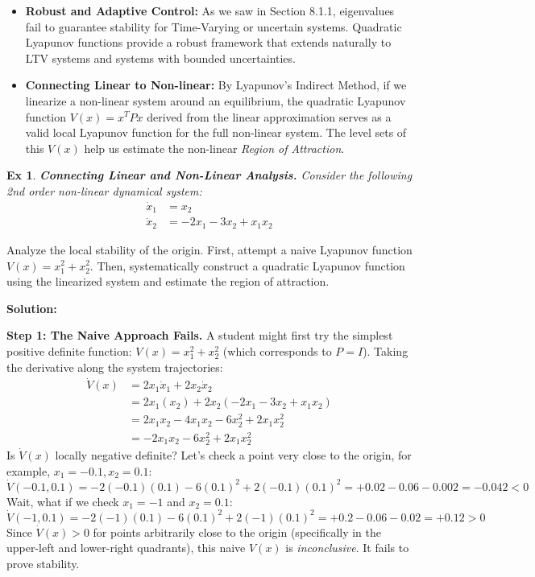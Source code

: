 \documentclass[twoside, 11pt]{article}
\newtheorem{exmp}[theorem]{Ex}
\begin{document}
\begin{itemize}
    \item \textbf{Robust and Adaptive Control:} As we saw in Section 8.1.1, eigenvalues fail to guarantee stability for Time-Varying or uncertain systems. Quadratic Lyapunov functions provide a robust framework that extends naturally to LTV systems and systems with bounded uncertainties.
    \item \textbf{Connecting Linear to Non-linear:} By Lyapunov's Indirect Method, if we linearize a non-linear system around an equilibrium, the quadratic Lyapunov function $V(x) = x^T P x$ derived from the linear approximation serves as a valid local Lyapunov function for the full non-linear system. The level sets of this $V(x)$ help us estimate the non-linear \textit{Region of Attraction}.
\end{itemize}

\begin{exmp}
\textbf{Connecting Linear and Non-Linear Analysis.} Consider the following 2nd order non-linear dynamical system:
\begin{align*}
\dot{x}_1 &= x_2 \\
\dot{x}_2 &= -2x_1 - 3x_2 + x_1 x_2
\end{align*}
\end{exmp}
Analyze the local stability of the origin. First, attempt a naive Lyapunov function $V(x) = x_1^2 + x_2^2$. Then, systematically construct a quadratic Lyapunov function using the linearized system and estimate the region of attraction.

\textbf{Solution:}

\textbf{Step 1: The Naive Approach Fails.}
A student might first try the simplest positive definite function: $V(x) = x_1^2 + x_2^2$ (which corresponds to $P = I$). Taking the derivative along the system trajectories:
%
\begin{align*}
\dot{V}(x) &= 2x_1 \dot{x}_1 + 2x_2 \dot{x}_2 \\
&= 2x_1(x_2) + 2x_2(-2x_1 - 3x_2 + x_1 x_2) \\
&= 2x_1 x_2 - 4x_1 x_2 - 6x_2^2 + 2x_1 x_2^2 \\
&= -2x_1 x_2 - 6x_2^2 + 2x_1 x_2^2
\end{align*}
%
Is $\dot{V}(x)$ locally negative definite? Let's check a point very close to the origin, for example, $x_1 = -0.1, x_2 = 0.1$:
$$ \dot{V}(-0.1, 0.1) = -2(-0.1)(0.1) - 6(0.1)^2 + 2(-0.1)(0.1)^2 = +0.02 - 0.06 - 0.002 = -0.042 < 0 $$
Wait, what if we check $x_1 = -1$ and $x_2 = 0.1$:
$$ \dot{V}(-1, 0.1) = -2(-1)(0.1) - 6(0.1)^2 + 2(-1)(0.1)^2 = +0.2 - 0.06 - 0.02 = +0.12 > 0 $$
Since $\dot{V}(x) > 0$ for points arbitrarily close to the origin (specifically in the upper-left and lower-right quadrants), this naive $V(x)$ is \textit{inconclusive}. It fails to prove stability.
\end{document}
